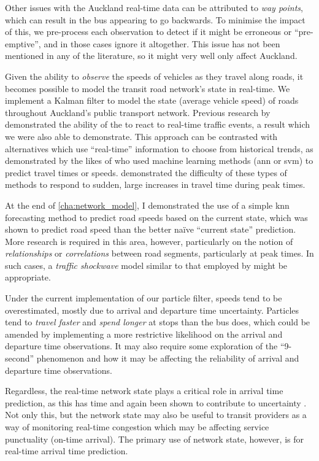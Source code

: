 Other issues with the Auckland real-time data can be attributed to \emph{way points}, which can result in the bus appearing to go backwards. To minimise the impact of this, we pre-process each observation to detect if it might be erroneous or ``pre-emptive'', and in those cases ignore it altogether. This issue has not been mentioned in any of the literature, so it might very well only affect Auckland.


Given the ability to \emph{observe} the speeds of vehicles as they travel along roads, it becomes possible to model the transit road network's state in real-time. We implement a Kalman filter to model the state (average vehicle speed) of roads throughout Auckland's public transport network. Previous research by \citet{Shalaby_2004} demonstrated the ability of the \kf{} to react to real-time traffic events, a result which we were also able to demonstrate. This approach can be contrasted with alternatives which use ``real-time'' information to choose from historical trends, as demonstrated by the likes of \citet{Chen_2014,Julio_2016,Yu_2010,Yu_2011,Celan_2017} who used machine learning methods (\gls{ann} or \gls{svm}) to predict travel times or speeds.  demonstrated the difficulty of these types of methods to respond to sudden, large increases in travel time during peak times.


At the end of \cref{cha:network_model}, I demonstrated the use of a simple \gls{knn} forecasting method to predict road speeds based on the current state, which was shown to predict road speed than the better na\"ive ``current state'' prediction. More research is required in this area, however, particularly on the notion of \emph{relationships} or \emph{correlations} between road segments, particularly at peak times. In such cases, a \emph{traffic shockwave} model similar to that employed by \citet{Julio_2016} might be appropriate.


Under the current implementation of our particle filter, speeds tend to be overestimated, mostly due to arrival and departure time uncertainty. Particles tend to \emph{travel faster} and \emph{spend longer} at stops than the bus does, which could be amended by implementing a more restrictive likelihood on the arrival and departure time observations. It may also require some exploration of the ``9-second'' phenomenon and how it may be affecting the reliability of arrival and departure time observations.


Regardless, the real-time network state plays a critical role in arrival time prediction, as this has time and again been shown to contribute to uncertainty \citep{Shalaby_2004,Yu_2006,Yu_2010,Yu_2011,Julio_2016}. Not only this, but the network state may also be useful to transit providers as a way of monitoring real-time congestion which may be affecting service punctuality (on-time arrival). The primary use of network state, however, is for real-time arrival time prediction.


